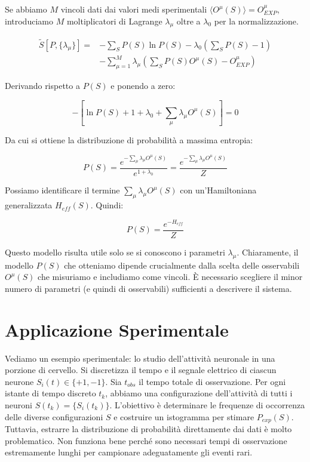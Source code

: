 Se abbiamo $M$ vincoli dati dai valori medi sperimentali $\langle O^\mu(S) \rangle = O_{EXP}^\mu$, introduciamo $M$ moltiplicatori di Lagrange $\lambda_\mu$ oltre a $\lambda_0$ per la normalizzazione.

\begin{align} \label{eq:ch22_21}
\tilde{S}[P, \{\lambda_\mu\}] = &-\sum_S P(S) \ln P(S) - \lambda_0 \left(\sum_S P(S) - 1\right) \nonumber \\
&- \sum_{\mu=1}^M \lambda_\mu \left(\sum_S P(S) O^\mu(S) - O_{EXP}^\mu\right)
\end{align}

Derivando rispetto a $P(S)$ e ponendo a zero:

\begin{equation} \label{eq:ch22_22}
-[\ln P(S) + 1 + \lambda_0 + \sum_\mu \lambda_\mu O^\mu(S)] = 0
\end{equation}

Da cui si ottiene la distribuzione di probabilità a massima entropia:

\begin{equation} \label{eq:ch22_23}
P(S) = \frac{e^{-\sum_\mu \lambda_\mu O^\mu(S)}}{e^{1+\lambda_0}} = \frac{e^{-\sum_\mu \lambda_\mu O^\mu(S)}}{Z}
\end{equation}

Possiamo identificare il termine $\sum_\mu \lambda_\mu O^\mu(S)$ con un'Hamiltoniana generalizzata $H_{eff}(S)$.
Quindi:

\begin{equation} \label{eq:ch22_24}
P(S) = \frac{e^{-H_{eff}}}{Z}
\end{equation}

Questo modello risulta utile solo se si conoscono i parametri $\lambda_\mu$.
Chiaramente, il modello $P(S)$ che otteniamo dipende crucialmente dalla scelta delle osservabili $O^\mu(S)$ che misuriamo e includiamo come vincoli. È necessario scegliere il minor numero di parametri (e quindi di osservabili) sufficienti a descrivere il sistema.


\section{Applicazione Sperimentale}
Vediamo un esempio sperimentale: lo studio dell'attività neuronale in una porzione di cervello.
Si discretizza il tempo e il segnale elettrico di ciascun neurone $S_i(t) \in \{+1, -1\}$.
Sia $t_{obs}$ il tempo totale di osservazione. Per ogni istante di tempo discreto $t_k$, abbiamo una configurazione dell'attività di tutti i neuroni $S(t_k) = \{S_i(t_k)\}$.
L'obiettivo è determinare le frequenze di occorrenza delle diverse configurazioni $S$ e costruire un istogramma per stimare $P_{exp}(S)$. Tuttavia, estrarre la distribuzione di probabilità direttamente dai dati è molto problematico. Non funziona bene perché sono necessari tempi di osservazione estremamente lunghi per campionare adeguatamente gli eventi rari.

